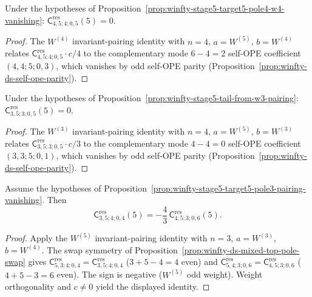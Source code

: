 \begin{proposition}
\label{prop:winfty-stage5-target4-pole5-w4-vanishing}
Under the hypotheses of
Proposition~\ref{prop:winfty-stage5-target5-pole4-w4-vanishing}:
$\mathsf{C}^{\mathrm{res}}_{4,5;4;0,5}(5)=0$.
\end{proposition}

\begin{proof}
The $W^{(4)}$ invariant-pairing identity with \(n=4\), \(a=W^{(5)}\), \(b=W^{(4)}\) relates \(\mathsf{C}^{\mathrm{res}}_{4,5;4;0,5}\cdot c/4\) to the complementary mode \(6-4=2\) self-OPE coefficient \((4,4;5;0,3)\), which vanishes by odd self-OPE parity (Proposition~\ref{prop:winfty-ds-self-ope-parity}).
\end{proof}

\begin{proposition}
\label{prop:winfty-stage5-target3-pole5-w3-vanishing}
Under the hypotheses of
Proposition~\ref{prop:winfty-stage5-tail-from-w3-pairing}:
$\mathsf{C}^{\mathrm{res}}_{3,5;3;0,5}(5)=0$.
\end{proposition}

\begin{proof}
The $W^{(3)}$ invariant-pairing identity with \(n=4\), \(a=W^{(5)}\), \(b=W^{(3)}\) relates \(\mathsf{C}^{\mathrm{res}}_{3,5;3;0,5}\cdot c/3\) to the complementary mode \(4-4=0\) self-OPE coefficient \((3,3;5;0,1)\), which vanishes by odd self-OPE parity (Proposition~\ref{prop:winfty-ds-self-ope-parity}).
\end{proof}

\begin{proposition}
\label{prop:winfty-stage5-transport-cross-target-reduction}
Assume the hypotheses of
Proposition~\ref{prop:winfty-stage5-target5-pole3-pairing-vanishing}.
Then
\[
\mathsf{C}^{\mathrm{res}}_{3,5;4;0,4}(5)
=
-\frac{4}{3}\,
\mathsf{C}^{\mathrm{res}}_{4,5;3;0,6}(5).
\]
\end{proposition}

\begin{proof}
Apply the $W^{(5)}$ invariant-pairing identity with \(n=3\), \(a=W^{(3)}\), \(b=W^{(4)}\).  The swap symmetry of Proposition~\ref{prop:winfty-ds-mixed-top-pole-swap} gives \(\mathsf{C}^{\mathrm{res}}_{5,3;4;0,4}=\mathsf{C}^{\mathrm{res}}_{3,5;4;0,4}\) (\(3+5-4=4\) even) and \(\mathsf{C}^{\mathrm{res}}_{5,4;3;0,6}=\mathsf{C}^{\mathrm{res}}_{4,5;3;0,6}\) (\(4+5-3=6\) even).  The sign is negative (\(W^{(5)}\) odd weight).  Weight orthogonality and \(c\neq 0\) yield the displayed identity.
\end{proof}

